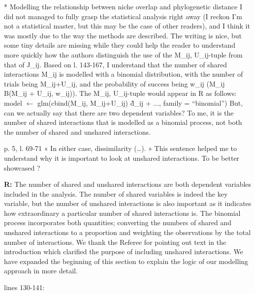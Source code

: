 \documentclass[12pt]{letter}
\newenvironment{refquote}{\bigskip \begin{it}}{\end{it}\smallskip}
\begin{document}
		\begin{refquote}
			* Modelling the relationship between niche overlap and phylogenetic distance
			I did not managed to fully grasp the statistical analysis right away (I reckon I'm not a statistical master, but this may be the case of other readers), and I think it was mostly due to the way the methods are described. The writing is nice, but some tiny details are missing while they could help the reader to understand more quickly how the authors distinguish the use of the {M\_ij, U\_ij}-tuple from that of J\_ij.
			Based on l. 143-167, I understand that the number of shared interactions M\_ij is modelled with a binomial distribution, with the number of trials being M\_ij+U\_ij, and the probability of success being w\_ij (M\_ij ~ B(M\_ij + U\_ij, w\_ij)). The {M\_ij, U\_ij}-tuple would appear in R as follows:
			model $\leftarrow$ glm(cbind(M\_ij, M\_ij+U\_ij) \~ d\_ij + ..., family = “binomial”)
			But, can we actually say that there are two dependent variables? To me, it is the number of shared interactions that is modelled as a binomial process, not both the number of shared and unshared interactions.

			\smallskip

			p. 5, l. 69-71 « In either case, dissimilarity (…). » This sentence helped me to understand why it is important to look at unshared interactions. To be better showcased ?

		\end{refquote}


		\textbf{R:} The number of shared and unshared interactions are both dependent variables included in the analysis. The number of shared variables is indeed the key variable, but the number of unshared interactions is also important as it indicates how extraordinary a particular number of shared interactions is. The binomial process incorporates both quantities; converting the numbers of shared and unshared interactions to a proportion and weighting the observations by the total number of interactions. We thank the Referee for pointing out text in the introduction which clarified the purpose of including unshared interactions. We have expanded the beginning of this section to explain the logic of our modelling approach in more detail.


		lines 130-141:
\end{document}
